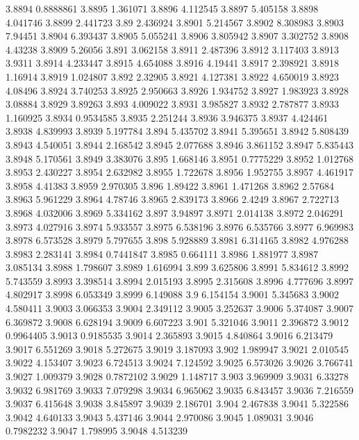 3.8894  0.8888861
3.8895  1.361071
3.8896  4.112545
3.8897  5.405158
3.8898  4.041746
3.8899  2.441723
3.89  2.436924
3.8901  5.214567
3.8902  8.308983
3.8903  7.94451
3.8904  6.393437
3.8905  5.055241
3.8906  3.805942
3.8907  3.302752
3.8908  4.43238
3.8909  5.26056
3.891  3.062158
3.8911  2.487396
3.8912  3.117403
3.8913  3.9311
3.8914  4.233447
3.8915  4.654088
3.8916  4.19441
3.8917  2.398921
3.8918  1.16914
3.8919  1.024807
3.892  2.32905
3.8921  4.127381
3.8922  4.650019
3.8923  4.08496
3.8924  3.740253
3.8925  2.950663
3.8926  1.934752
3.8927  1.983923
3.8928  3.08884
3.8929  3.89263
3.893  4.009022
3.8931  3.985827
3.8932  2.787877
3.8933  1.160925
3.8934  0.9534585
3.8935  2.251244
3.8936  3.946375
3.8937  4.424461
3.8938  4.839993
3.8939  5.197784
3.894  5.435702
3.8941  5.395651
3.8942  5.808439
3.8943  4.540051
3.8944  2.168542
3.8945  2.077688
3.8946  3.861152
3.8947  5.835443
3.8948  5.170561
3.8949  3.383076
3.895  1.668146
3.8951  0.7775229
3.8952  1.012768
3.8953  2.430227
3.8954  2.632982
3.8955  1.722678
3.8956  1.952755
3.8957  4.461917
3.8958  4.41383
3.8959  2.970305
3.896  1.89422
3.8961  1.471268
3.8962  2.57684
3.8963  5.961229
3.8964  4.78746
3.8965  2.839173
3.8966  2.4249
3.8967  2.722713
3.8968  4.032006
3.8969  5.334162
3.897  3.94897
3.8971  2.014138
3.8972  2.046291
3.8973  4.027916
3.8974  5.933557
3.8975  6.538196
3.8976  6.535766
3.8977  6.969983
3.8978  6.573528
3.8979  5.797655
3.898  5.928889
3.8981  6.314165
3.8982  4.976288
3.8983  2.283141
3.8984  0.7441847
3.8985  0.664111
3.8986  1.881977
3.8987  3.085134
3.8988  1.798607
3.8989  1.616994
3.899  3.625806
3.8991  5.834612
3.8992  5.743559
3.8993  3.398514
3.8994  2.015193
3.8995  2.315608
3.8996  4.777696
3.8997  4.802917
3.8998  6.053349
3.8999  6.149088
3.9  6.154154
3.9001  5.345683
3.9002  4.580411
3.9003  3.066353
3.9004  2.349112
3.9005  3.252637
3.9006  5.374087
3.9007  6.369872
3.9008  6.628194
3.9009  6.607223
3.901  5.321046
3.9011  2.396872
3.9012  0.9964405
3.9013  0.9185535
3.9014  2.365893
3.9015  4.840864
3.9016  6.213479
3.9017  6.551269
3.9018  5.272675
3.9019  3.187093
3.902  1.989947
3.9021  2.010545
3.9022  4.153407
3.9023  6.724513
3.9024  7.124592
3.9025  6.573026
3.9026  3.766741
3.9027  1.009379
3.9028  0.7872102
3.9029  1.148717
3.903  3.969909
3.9031  6.33278
3.9032  6.981769
3.9033  7.079298
3.9034  6.965062
3.9035  6.843457
3.9036  7.216559
3.9037  6.415648
3.9038  3.845897
3.9039  2.186701
3.904  2.467838
3.9041  5.322586
3.9042  4.640133
3.9043  5.437146
3.9044  2.970086
3.9045  1.089031
3.9046  0.7982232
3.9047  1.798995
3.9048  4.513239

